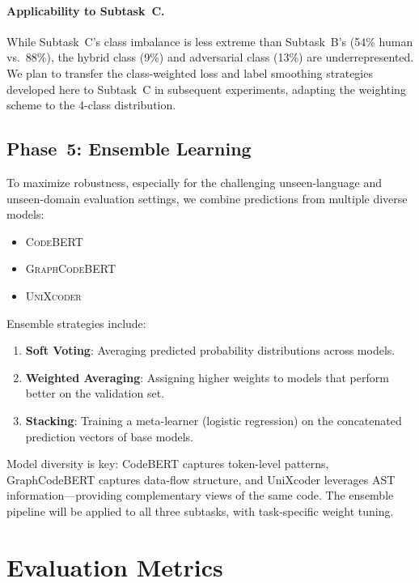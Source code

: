 \documentclass[11pt]{article}
\begin{document}
\paragraph{Applicability to Subtask~C.} While Subtask~C's class imbalance is less extreme than Subtask~B's (54\% human vs.\ 88\%), the hybrid class (9\%) and adversarial class (13\%) are underrepresented. We plan to transfer the class-weighted loss and label smoothing strategies developed here to Subtask~C in subsequent experiments, adapting the weighting scheme to the 4-class distribution.

\subsection{Phase~5: Ensemble Learning}

To maximize robustness, especially for the challenging unseen-language and unseen-domain evaluation settings, we combine predictions from multiple diverse models:

\begin{itemize}
    \item \textsc{CodeBERT} \cite{feng-etal-2020-codebert}
    \item \textsc{GraphCodeBERT} \cite{guo2021graphcodebert}
    \item \textsc{UniXcoder} \cite{guo2022unixcoder}
\end{itemize}

Ensemble strategies include:
\begin{enumerate}
    \item \textbf{Soft Voting}: Averaging predicted probability distributions across models.
    \item \textbf{Weighted Averaging}: Assigning higher weights to models that perform better on the validation set.
    \item \textbf{Stacking}: Training a meta-learner (logistic regression) on the concatenated prediction vectors of base models.
\end{enumerate}

Model diversity is key: CodeBERT captures token-level patterns, GraphCodeBERT captures data-flow structure, and UniXcoder leverages AST information---providing complementary views of the same code. The ensemble pipeline will be applied to all three subtasks, with task-specific weight tuning.

\section{Evaluation Metrics}
\label{sec:metrics}
\end{document}

